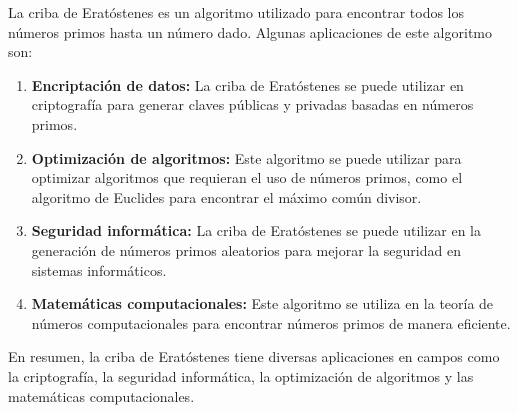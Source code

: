 La criba de Eratóstenes es un algoritmo utilizado para encontrar todos los números primos hasta un número dado. Algunas aplicaciones de este algoritmo son:

\begin{enumerate}
	\item \textbf{Encriptación de datos:} La criba de Eratóstenes se puede utilizar en criptografía para generar claves públicas y privadas basadas en números primos.
	\item \textbf{Optimización de algoritmos:} Este algoritmo se puede utilizar para optimizar algoritmos que requieran el uso de números primos, como el algoritmo de Euclides para encontrar el máximo común divisor.
	\item \textbf{Seguridad informática:} La criba de Eratóstenes se puede utilizar en la generación de números primos aleatorios para mejorar la seguridad en sistemas informáticos.
	\item \textbf{Matemáticas computacionales:} Este algoritmo se utiliza en la teoría de números computacionales para encontrar números primos de manera eficiente.   
\end{enumerate}

En resumen, la criba de Eratóstenes tiene diversas aplicaciones en campos como la criptografía, la seguridad informática, la optimización de algoritmos y las matemáticas computacionales.